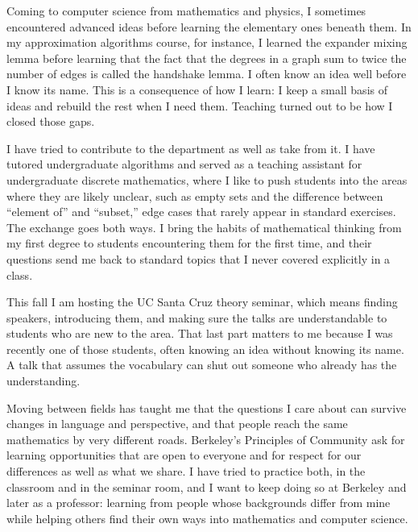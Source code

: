 \documentclass[11pt]{article}
\begin{document}
Coming to computer science from mathematics and physics, I sometimes encountered advanced ideas before learning the elementary ones beneath them. In my approximation algorithms course, for instance, I learned the expander mixing lemma before learning that the fact that the degrees in a graph sum to twice the number of edges is called the handshake lemma. I often know an idea well before I know its name. This is a consequence of how I learn: I keep a small basis of ideas and rebuild the rest when I need them. Teaching turned out to be how I closed those gaps.

I have tried to contribute to the department as well as take from it. I have tutored undergraduate algorithms and served as a teaching assistant for undergraduate discrete mathematics, where I like to push students into the areas where they are likely unclear, such as empty sets and the difference between ``element of'' and ``subset,'' edge cases that rarely appear in standard exercises. The exchange goes both ways. I bring the habits of mathematical thinking from my first degree to students encountering them for the first time, and their questions send me back to standard topics that I never covered explicitly in a class.

This fall I am hosting the UC Santa Cruz theory seminar, which means finding speakers, introducing them, and making sure the talks are understandable to students who are new to the area. That last part matters to me because I was recently one of those students, often knowing an idea without knowing its name. A talk that assumes the vocabulary can shut out someone who already has the understanding.

Moving between fields has taught me that the questions I care about can survive changes in language and perspective, and that people reach the same mathematics by very different roads. Berkeley's Principles of Community ask for learning opportunities that are open to everyone and for respect for our differences as well as what we share. I have tried to practice both, in the classroom and in the seminar room, and I want to keep doing so at Berkeley and later as a professor: learning from people whose backgrounds differ from mine while helping others find their own ways into mathematics and computer science.
\end{document}
